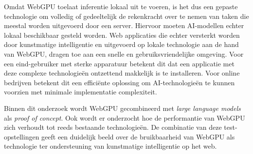 \bigbreak{}

Omdat WebGPU toelaat inferentie lokaal uit te voeren, is het dus een gepaste technologie om volledig of gedeeltelijk de rekenkracht over te nemen van taken die meestal worden uitgevoerd door een server. Hiervoor moeten AI-modellen echter lokaal beschikbaar gesteld worden. Web applicaties die echter versterkt worden door kunstmatige intelligentie en uitgevoerd op lokale technologie aan de hand van WebGPU, dragen toe aan een snelle en gebruiksvriendelijke omgeving. Voor een eind-gebruiker met sterke apparatuur betekent dit dat een applicatie met deze complexe technologieën ontzettend makkelijk is te installeren. Voor online bedrijven betekent dit een efficiënte oplossing om AI-technologieën te kunnen voorzien met minimale implementatie complexiteit.

\bigbreak{}

Binnen dit onderzoek wordt WebGPU gecombineerd met \textit{large language models} als \textit{proof of concept}. Ook wordt er onderzocht hoe de performantie van WebGPU zich verhoudt tot reeds bestaande technologieën. De combinatie van deze test-op\-ste\-llingen geeft een duidelijk beeld over de bruikbaarheid van WebGPU als technologie ter ondersteuning van kunstmatige intelligentie op het web.

\bigbreak{}
